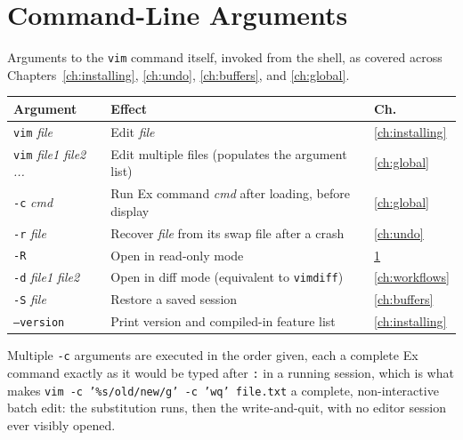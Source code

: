 \chapter{Command-Line Arguments}
\label{app:cli}

Arguments to the \texttt{vim} command itself, invoked from the shell, as covered across Chapters~\ref{ch:installing}, \ref{ch:undo}, \ref{ch:buffers}, and \ref{ch:global}.

\begin{longtable}{@{}l p{9cm} l@{}}
\textbf{Argument} & \textbf{Effect} & \textbf{Ch.} \\
\hline
\endhead
\texttt{vim} \textit{file} & Edit \textit{file} & \ref{ch:installing} \\
\texttt{vim} \textit{file1 file2 ...} & Edit multiple files (populates the argument list) & \ref{ch:global} \\
\texttt{-c} \textit{cmd} & Run Ex command \textit{cmd} after loading, before display & \ref{ch:global} \\
\texttt{-r} \textit{file} & Recover \textit{file} from its swap file after a crash & \ref{ch:undo} \\
\texttt{-R} & Open in read-only mode & \ref{app:cli} \\
\texttt{-d} \textit{file1 file2} & Open in diff mode (equivalent to \texttt{vimdiff}) & \ref{ch:workflows} \\
\texttt{-S} \textit{file} & Restore a saved session & \ref{ch:buffers} \\
\texttt{--version} & Print version and compiled-in feature list & \ref{ch:installing} \\
\end{longtable}

Multiple \texttt{-c} arguments are executed in the order given, each a complete Ex command exactly as it would be typed after \texttt{:} in a running session, which is what makes \texttt{vim -c '\%s/old/new/g' -c 'wq' file.txt} a complete, non-interactive batch edit: the substitution runs, then the write-and-quit, with no editor session ever visibly opened.
